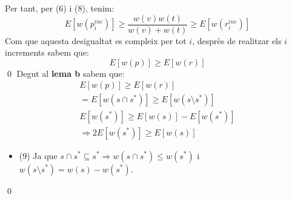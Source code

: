 Per tant, per (6) i (8), tenim:
\[
E[w(p_i^{inc})] \geq \frac{w(v)w(t)}{w(v)+w(t)} \geq E[w(r_i^{inc})]
\]
Com que aquesta desigualtat es compleix per tot $i$, desprès de realitzar els $i$ increments sabem que:
\[
E[w(p)] \geq E[w(r)]
\]
\renewcommand\qedsymbol{$\square$}
\qed
\newpage
Degut al \textbf{lema b} sabem que:
\begin{eqnarray}
    E[w(p)] \geq E[w(r)]\nonumber \\
    = E[w(s \cap s^{*})] \geq E[w(s \setminus s^{*})] \nonumber \\
    E[w(s^{*})] \geq E[w(s)] - E[w(s^{*})]  \\
    \Rightarrow 2E[w(s^{*})] \geq E[w(s)] \nonumber
\end{eqnarray}
\begin{itemize}
    \item (9) Ja que $s \cap s^{*} \subseteq s^{*} \Rightarrow w(s \cap s^{*}) \leq w(s^{*})$ i $w(s \setminus s^{*}) = w(s) - w(s^{*})$.
\end{itemize}
\renewcommand\qedsymbol{$\blacksquare$}
\qed